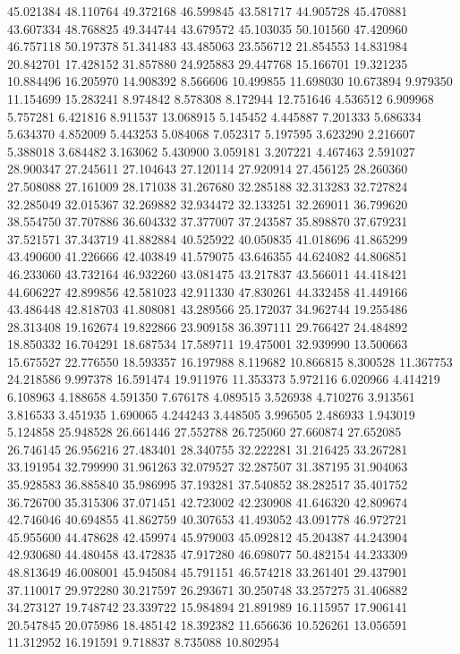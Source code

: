 45.021384
48.110764
49.372168
46.599845
43.581717
44.905728
45.470881
43.607334
48.768825
49.344744
43.679572
45.103035
50.101560
47.420960
46.757118
50.197378
51.341483
43.485063
23.556712
21.854553
14.831984
20.842701
17.428152
31.857880
24.925883
29.447768
15.166701
19.321235
10.884496
16.205970
14.908392
8.566606
10.499855
11.698030
10.673894
9.979350
11.154699
15.283241
8.974842
8.578308
8.172944
12.751646
4.536512
6.909968
5.757281
6.421816
8.911537
13.068915
5.145452
4.445887
7.201333
5.686334
5.634370
4.852009
5.443253
5.084068
7.052317
5.197595
3.623290
2.216607
5.388018
3.684482
3.163062
5.430900
3.059181
3.207221
4.467463
2.591027
28.900347
27.245611
27.104643
27.120114
27.920914
27.456125
28.260360
27.508088
27.161009
28.171038
31.267680
32.285188
32.313283
32.727824
32.285049
32.015367
32.269882
32.934472
32.133251
32.269011
36.799620
38.554750
37.707886
36.604332
37.377007
37.243587
35.898870
37.679231
37.521571
37.343719
41.882884
40.525922
40.050835
41.018696
41.865299
43.490600
41.226666
42.403849
41.579075
43.646355
44.624082
44.806851
46.233060
43.732164
46.932260
43.081475
43.217837
43.566011
44.418421
44.606227
42.899856
42.581023
42.911330
47.830261
44.332458
41.449166
43.486448
42.818703
41.808081
43.289566
25.172037
34.962744
19.255486
28.313408
19.162674
19.822866
23.909158
36.397111
29.766427
24.484892
18.850332
16.704291
18.687534
17.589711
19.475001
32.939990
13.500663
15.675527
22.776550
18.593357
16.197988
8.119682
10.866815
8.300528
11.367753
24.218586
9.997378
16.591474
19.911976
11.353373
5.972116
6.020966
4.414219
6.108963
4.188658
4.591350
7.676178
4.089515
3.526938
4.710276
3.913561
3.816533
3.451935
1.690065
4.244243
3.448505
3.996505
2.486933
1.943019
5.124858
25.948528
26.661446
27.552788
26.725060
27.660874
27.652085
26.746145
26.956216
27.483401
28.340755
32.222281
31.216425
33.267281
33.191954
32.799990
31.961263
32.079527
32.287507
31.387195
31.904063
35.928583
36.885840
35.986995
37.193281
37.540852
38.282517
35.401752
36.726700
35.315306
37.071451
42.723002
42.230908
41.646320
42.809674
42.746046
40.694855
41.862759
40.307653
41.493052
43.091778
46.972721
45.955600
44.478628
42.459974
45.979003
45.092812
45.204387
44.243904
42.930680
44.480458
43.472835
47.917280
46.698077
50.482154
44.233309
48.813649
46.008001
45.945084
45.791151
46.574218
33.261401
29.437901
37.110017
29.972280
30.217597
26.293671
30.250748
33.257275
31.406882
34.273127
19.748742
23.339722
15.984894
21.891989
16.115957
17.906141
20.547845
20.075986
18.485142
18.392382
11.656636
10.526261
13.056591
11.312952
16.191591
9.718837
8.735088
10.802954
